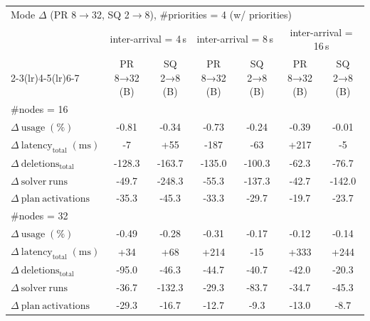 \begin{tabular}{l c c c c c c}
\toprule
\multicolumn{7}{l}{Mode $\Delta$ (PR 8$\rightarrow$32, SQ 2$\rightarrow$8), \#priorities = 4 (w/ priorities)} \\
\addlinespace[0.2em]
 & \multicolumn{2}{c}{inter-arrival = 4\,s} & \multicolumn{2}{c}{inter-arrival = 8\,s} & \multicolumn{2}{c}{inter-arrival = 16\,s} \\
\cmidrule(lr){2-3}\cmidrule(lr){4-5}\cmidrule(lr){6-7}
 & PR 8→32 (B) & SQ 2→8 (B) & PR 8→32 (B) & SQ 2→8 (B) & PR 8→32 (B) & SQ 2→8 (B) \\
\midrule
\multicolumn{7}{l}{\#nodes = 16} \\
\midrule
$\Delta\ \mathrm{usage}\;(\%)$ & -0.81 & -0.34 & -0.73 & -0.24 & -0.39 & -0.01 \\
$\Delta\ \mathrm{latency}_{\mathrm{total}}\;(\mathrm{ms})$ & -7 & +55 & -187 & -63 & +217 & -5 \\
$\Delta\ \mathrm{deletions}_{\mathrm{total}}$ & -128.3 & -163.7 & -135.0 & -100.3 & -62.3 & -76.7 \\
$\Delta\ \mathrm{solver\ runs}$ & -49.7 & -248.3 & -55.3 & -137.3 & -42.7 & -142.0 \\
$\Delta\ \mathrm{plan\ activations}$ & -35.3 & -45.3 & -33.3 & -29.7 & -19.7 & -23.7 \\
\midrule
\multicolumn{7}{l}{\#nodes = 32} \\
\midrule
$\Delta\ \mathrm{usage}\;(\%)$ & -0.49 & -0.28 & -0.31 & -0.17 & -0.12 & -0.14 \\
$\Delta\ \mathrm{latency}_{\mathrm{total}}\;(\mathrm{ms})$ & +34 & +68 & +214 & -15 & +333 & +244 \\
$\Delta\ \mathrm{deletions}_{\mathrm{total}}$ & -95.0 & -46.3 & -44.7 & -40.7 & -42.0 & -20.3 \\
$\Delta\ \mathrm{solver\ runs}$ & -36.7 & -132.3 & -29.3 & -83.7 & -34.7 & -45.3 \\
$\Delta\ \mathrm{plan\ activations}$ & -29.3 & -16.7 & -12.7 & -9.3 & -13.0 & -8.7 \\
\bottomrule
\end{tabular}



